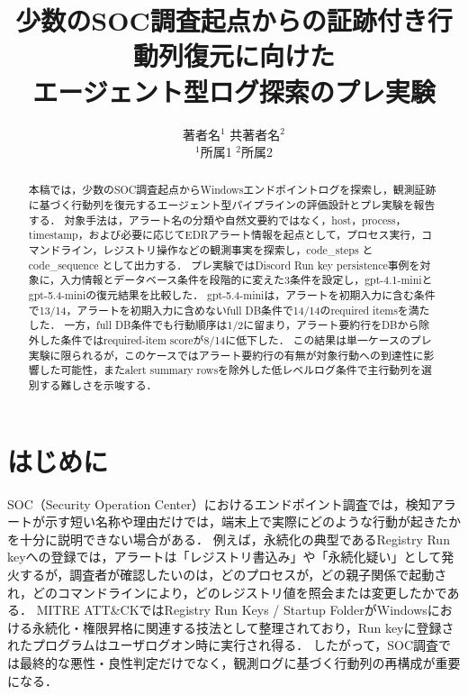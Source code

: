 \documentclass[a4paper,twocolumn,10pt]{ltjsarticle}
\newcommand{\code}[1]{{\small\ttfamily\addfontfeatures{Scale=0.95}#1}}
\begin{document}
\title{\vspace{-8mm}少数のSOC調査起点からの証跡付き行動列復元に向けた\\エージェント型ログ探索のプレ実験}
\author{著者名$^{1}$ \quad 共著者名$^{2}$\\
{\small $^{1}$所属1 \quad $^{2}$所属2}}
\date{}
\maketitle
\thispagestyle{empty}

\begin{abstract}
本稿では，少数のSOC調査起点からWindowsエンドポイントログを探索し，観測証跡に基づく行動列を復元するエージェント型パイプラインの評価設計とプレ実験を報告する．
対象手法は，アラート名の分類や自然文要約ではなく，host，process，timestamp，および必要に応じてEDRアラート情報を起点として，プロセス実行，コマンドライン，レジストリ操作などの観測事実を探索し，\code{code\_steps} と \code{code\_sequence} として出力する．
プレ実験ではDiscord Run key persistence事例を対象に，入力情報とデータベース条件を段階的に変えた3条件を設定し，gpt-4.1-miniとgpt-5.4-miniの復元結果を比較した．
gpt-5.4-miniは，アラートを初期入力に含む条件で13/14，アラートを初期入力に含めないfull DB条件で14/14のrequired itemsを満たした．
一方，full DB条件でも行動順序は1/2に留まり，アラート要約行をDBから除外した条件ではrequired-item scoreが8/14に低下した．
この結果は単一ケースのプレ実験に限られるが，このケースではアラート要約行の有無が対象行動への到達性に影響した可能性，またalert summary rowsを除外した低レベルログ条件で主行動列を選別する難しさを示唆する．
\end{abstract}

\section{はじめに}

SOC（Security Operation Center）におけるエンドポイント調査では，検知アラートが示す短い名称や理由だけでは，端末上で実際にどのような行動が起きたかを十分に説明できない場合がある．
例えば，永続化の典型であるRegistry Run keyへの登録では，アラートは「レジストリ書込み」や「永続化疑い」として発火するが，調査者が確認したいのは，どのプロセスが，どの親子関係で起動され，どのコマンドラインにより，どのレジストリ値を照会または変更したかである．
MITRE ATT\&CKではRegistry Run Keys / Startup FolderがWindowsにおける永続化・権限昇格に関連する技法として整理されており，Run keyに登録されたプログラムはユーザログオン時に実行され得る\cite{mitre_t1547_001}．
したがって，SOC調査では最終的な悪性・良性判定だけでなく，観測ログに基づく行動列の再構成が重要になる．
\end{document}
